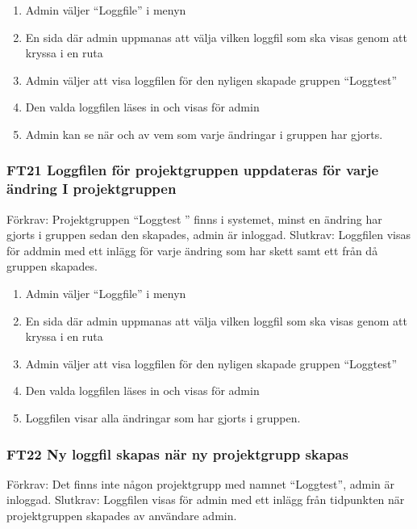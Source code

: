\documentclass[paper=a4, fontsize=11pt,twoside]{article}
\begin{document}
		
		\begin{enumerate}
		  \item     Admin väljer “Loggfile” i menyn
		  \item      En sida där admin uppmanas att välja vilken loggfil som ska visas genom att kryssa i en ruta
		  \item    Admin väljer att visa loggfilen för den nyligen skapade gruppen “Loggtest”
		  \item     Den valda loggfilen läses in och visas för admin
		  \item      Admin kan se när och av vem som varje ändringar i gruppen har
		  gjorts.
		  
		\end{enumerate}
		
		\subsubsection*{ FT21  Loggfilen för projektgruppen uppdateras för varje
		ändring I projektgruppen}

		Förkrav:  Projektgruppen “Loggtest ” finns i systemet, minst en ändring har
		gjorts i gruppen sedan den skapades, admin är inloggad.
		\newline
		Slutkrav: Loggfilen visas för addmin med ett inlägg för varje ändring som har skett samt ett från då gruppen skapades.
		
		\begin{enumerate}
		  \item     Admin väljer “Loggfile” i menyn
		  \item         En sida där admin uppmanas att välja vilken loggfil som ska visas genom att kryssa i en ruta
		  \item         Admin väljer att visa loggfilen för den nyligen skapade gruppen “Loggtest”
		  \item         Den valda loggfilen läses in och visas för admin
		  \item          Loggfilen visar alla ändringar som har gjorts i gruppen.
		  
		\end{enumerate}
		
		
		
		\subsubsection*{ FT22  Ny loggfil skapas när ny projektgrupp skapas}
		
		Förkrav: Det finns inte någon projektgrupp med namnet “Loggtest”, admin är
		inloggad.
		\newline
		Slutkrav:  Loggfilen visas för admin med ett inlägg från tidpunkten
		när projektgruppen skapades av användare admin.
		
\end{document}
